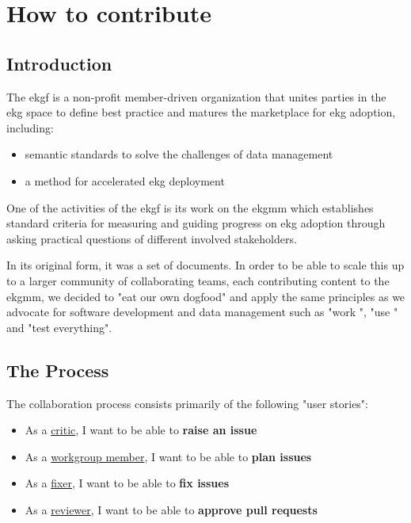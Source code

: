 \chapter{How to contribute}

\section{Introduction}

The \gls{ekgf} is a non-profit member-driven organization that unites parties
in the \gls{ekg} space to define best practice and matures the marketplace for
\gls{ekg} adoption, including:

\begin{itemize}
    \item semantic standards to solve the challenges of data management 
    \item a method for accelerated \gls{ekg} deployment
\end{itemize}

One of the activities of the \gls{ekgf} is its work on the \gls{ekgmm}
which establishes standard criteria for measuring and guiding progress
on \gls{ekg} adoption through asking practical questions of different
involved stakeholders. 

In its original form, it was a set of documents.
In order to be able to scale this up to a larger community of collaborating teams, 
each contributing content to the \gls{ekgmm}, we decided to "eat our own dogfood" 
and apply the same principles as we advocate for software development and 
data management such as "work ", "use "
and "test everything".

\section{The Process}

The collaboration process consists primarily of the following "user stories":

\begin{tcolorbox}[colback=secondary!5,colframe=secondary!80,title=\textbf{User Stories}]
    \begin{itemize}[leftmargin=1em]
        \item As a \underline{critic}, I want to be able to \textbf{raise an issue}
        \item As a \underline{workgroup member}, I want to be able to \textbf{plan issues}
        \item As a \underline{fixer}, I want to be able to \textbf{fix issues}
        \item As a \underline{reviewer}, I want to be able to \textbf{approve pull requests}
    \end{itemize}
\end{tcolorbox}

